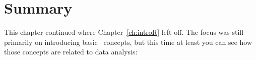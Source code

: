 %
%
%
%
%




\pbn
\section{Summary}\label{sec:summary3}

This chapter continued where Chapter~\ref{ch:introR} left off. The focus was still primarily on introducing basic \R\ concepts, but this time at least you can see how those concepts are related to data analysis:

